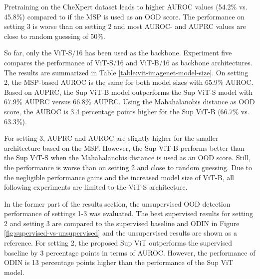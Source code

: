 Pretraining on the CheXpert dataset leads to higher AUROC values (54.2\% vs. 45.8\%) compared to \citep{Berger2021} if the MSP is used as an OOD score. 
The performance on setting 3 is worse than on setting 2 and most AUROC- and AUPRC values are close to random guessing of 50\%.
\par
So far, only the ViT-S/16 has been used as the backbone.
Experiment five compares the performance of ViT-S/16 and ViT-B/16 as backbone architectures.
The results are summarized in Table \ref{table:vit-imagenet-model-size}.
On setting 2, the MSP-based AUROC is the same for both model sizes with 65.9\% AUROC.
Based on AUPRC, the Sup ViT-B model outperforms the Sup ViT-S model with 67.9\% AUPRC versus 66.8\% AUPRC.
Using the Mahahalanobis distance as OOD score, the AUROC is 3.4 percentage points higher for the Sup ViT-B (66.7\% vs. 63.3\%).
\par
For setting 3, AUPRC and AUROC are slightly higher for the smaller architecture based on the MSP.
However, the Sup ViT-B performs better than the Sup ViT-S when the Mahahalanobis distance is used as an OOD score.
Still, the performance is worse than on setting 2 and close to random guessing.
Due to the negligible performance gains and the increased model size of ViT-B, all following experiments are limited to the ViT-S architecture.
\par
{}
In the former part of the results section, the unsupervised OOD detection performance of settings 1-3 was evaluated.
The best supervised results for setting 2 and setting 3 are compared to the supervised baseline and ODIN in Figure \ref{fig:supervised-vs-unsupervised} and the unsupervised results are shown as a reference.
For setting 2, the proposed Sup ViT outperforms the supervised baseline by 3 percentage points in terms of AUROC.
However, the performance of ODIN is 13 percentage points higher than the performance of the Sup ViT model.
